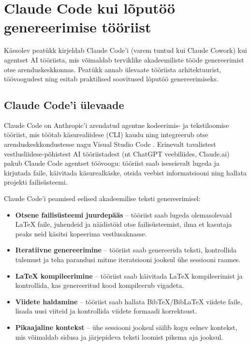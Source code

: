 \section{Claude Code kui lõputöö genereerimise tööriist} \label{claudecode}

Käesolev peatükk kirjeldab Claude Code'i (varem tuntud kui Claude Cowork) kui agentset AI tööriista, mis võimaldab terviklike akadeemiliste tööde genereerimist otse arenduskeskkonnas. Peatükk annab ülevaate tööriista arhitektuurist, töövoogudest ning esitab praktilised soovitused lõputöö genereerimiseks.

\subsection{Claude Code'i ülevaade} \label{subsec:claudecode-ulevaade}

Claude Code on Anthropic'i arendatud agentne kodeerimis- ja tekstiloomise tööriist, mis töötab käsurealiidese (CLI) kaudu ning integreerub otse arenduskeskkondustesse nagu Visual Studio Code \cite{anthropic2026claudecode}. Erinevalt tavalistest vestlusliidese-põhistest AI tööriistadest (nt ChatGPT veebiliides, Claude.ai) pakub Claude Code agentset töövoogu: tööriist saab iseseisvalt lugeda ja kirjutada faile, käivitada käsurealkäske, otsida veebist informatsiooni ning hallata projekti failisüsteemi.

Claude Code'i peamised eelised akadeemilise teksti genereerimisel:
\begin{itemize}
    \item \textbf{Otsene failisüsteemi juurdepääs} -- tööriist saab lugeda olemasolevaid \LaTeX{} faile, juhendeid ja näidistöid otse failisüsteemist, ilma et kasutaja peaks neid käsitsi kopeerima vestlusaknasse.
    \item \textbf{Iteratiivne genereerimine} -- tööriist saab genereerida teksti, kontrollida tulemust ja teha parandusi mitme iteratsiooni jooksul ühe sessiooni raames.
    \item \textbf{\LaTeX{} kompileerimine} -- tööriist saab käivitada \LaTeX{} kompileerimist ja kontrollida, kas genereeritud kood kompileerub vigadeta.
    \item \textbf{Viidete haldamine} -- tööriist saab hallata BibTeX/BibLaTeX viidete faile, lisada uusi viiteid ja kontrollida viidete formaadi korrektsust.
    \item \textbf{Pikaajaline kontekst} -- ühe sessiooni jooksul säilib kogu eelnev kontekst, mis võimaldab sidusa ja järjepideva teksti loomist pikema aja jooksul.
\end{itemize}

